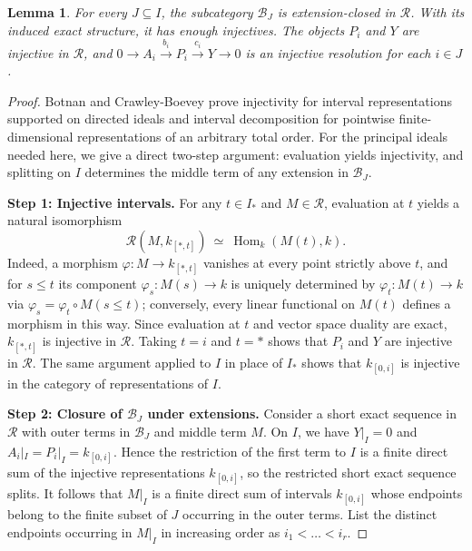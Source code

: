 \documentclass[a4paper,reqno,10pt]{amsart}
\numberwithin{equation}{section}
\newtheorem{lemma}[theorem]{Lemma}
\theoremstyle{definition}
\newcommand{\B}{\mathcal B}
\newcommand{\Rcat}{\mathcal R}
\DeclareMathOperator{\Hom}{Hom}
\begin{document}
\begin{lemma}\label{lem:intervals}
For every $J\subseteq I$, the subcategory $\B_J$ is extension-closed in
$\Rcat$. With its induced exact structure, it has enough injectives.
The objects $P_i$ and $Y$ are injective in $\Rcat$, and
$0\to A_i\xrightarrow{b_i}P_i\xrightarrow{c_i}Y\to0$ is an injective
resolution for each $i\in J$.
\end{lemma}
\begin{proof}
Botnan and Crawley-Boevey \cite[Lemma~2.1 and Theorem~1.2]{BCB} prove
injectivity for interval representations supported on directed ideals and
interval decomposition for pointwise finite-dimensional representations of an
arbitrary total order. For the principal ideals needed here, we give a direct
two-step argument: evaluation yields injectivity, and splitting on $I$
determines the middle term of any extension in $\B_J$.

\medskip\noindent\textbf{Step 1: Injective intervals.}
For any $t\in I_*$ and $M\in\Rcat$, evaluation at $t$ yields a natural
isomorphism
\[
  \Rcat(M,k_{[*,t]})\ \simeq\ \Hom_k(M(t),k).
\]
Indeed, a morphism $\varphi:M\to k_{[*,t]}$ vanishes at every point strictly
above $t$, and for $s\le t$ its component $\varphi_s:M(s)\to k$ is uniquely
determined by $\varphi_t:M(t)\to k$ via $\varphi_s=\varphi_t\circ M(s\le t)$;
conversely, every linear functional on $M(t)$ defines a morphism in this way.
Since evaluation at $t$ and vector space duality are exact, $k_{[*,t]}$ is
injective in $\Rcat$. Taking $t=i$ and $t=*$ shows that $P_i$ and $Y$ are
injective in $\Rcat$. The same argument applied to $I$ in place of $I_*$ shows
that $k_{[0,i]}$ is injective in the category of representations of $I$.

\medskip\noindent\textbf{Step 2: Closure of $\B_J$ under extensions.}
Consider a short exact sequence in $\Rcat$ with outer terms in $\B_J$ and
middle term $M$. On $I$, we have $Y|_I=0$ and $A_i|_I=P_i|_I=k_{[0,i]}$. Hence
the restriction of the first term to $I$ is a finite direct sum of the
injective representations $k_{[0,i]}$, so the restricted short exact sequence
splits. It follows that $M|_I$ is a finite direct sum of intervals $k_{[0,i]}$
whose endpoints belong to the finite subset of $J$ occurring in the outer
terms. List the distinct endpoints occurring in $M|_I$ in increasing order as
$i_1<\dots<i_r$.


\end{proof}
\end{document}
